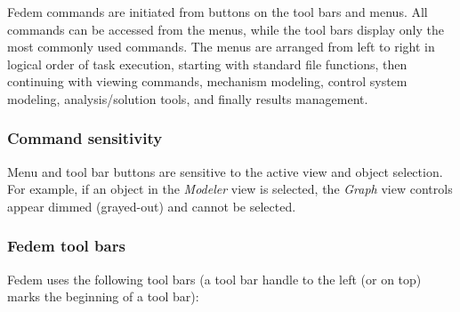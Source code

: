 
Fedem commands are initiated from buttons on the tool bars and menus.
All commands can be accessed from the menus, while the tool bars display only
the most commonly used commands.
The menus are arranged from left to right in logical order of task execution,
starting with standard file functions, then continuing with viewing commands,
mechanism modeling, control system modeling, analysis/solution tools,
and finally results management.

\subsubsection{Command sensitivity}

Menu and tool bar buttons are sensitive to the active view and object
selection. For example, if an object in the {\sl Modeler} view is
selected, the {\sl Graph} view controls appear dimmed (grayed-out) and
cannot be selected.

\subsubsection{Fedem tool bars}

Fedem uses the following tool bars (a tool bar handle to the left (or on
top) marks the beginning of a tool bar):

